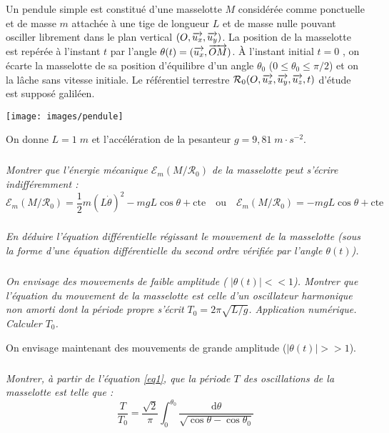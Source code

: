 \documentclass[10pt,oneside]{article}
\begin{document}
\begin{minipage}[c]{.6\linewidth}
Un pendule simple est constitué d'une masselotte $M$ considérée comme ponctuelle et de masse $m$ attachée à une tige de longueur $L$ et de masse nulle pouvant osciller librement dans le plan vertical $(O ,\overrightarrow{u_x} ,\overrightarrow{u_y} )$. La position de la masselotte
est repérée à l'instant $t$ par l'angle $\theta(t) = (\overrightarrow{u_x} , \overrightarrow{OM})$. À l'instant initial $t = 0$ , on écarte la masselotte de sa position d'équilibre d'un angle  $\theta_0$  ($0\leq \theta_0\leq\pi/2$) et on la lâche sans vitesse initiale. Le
référentiel terrestre $\mathcal{R}_0(O,\overrightarrow{u_x},\overrightarrow{u_y},\overrightarrow{u_z},t)$ d'étude est supposé galiléen.
\end{minipage}\hfill
\begin{minipage}[c]{.35\linewidth}
\begin{center}
\texttt{[image: images/pendule]}
\end{center}
\end{minipage}

On donne $L=1\;m$ et l'accélération de la pesanteur $g=9,81\; m\cdot s^{-2}$. 


\subparagraph{\label{q1}}
\textit{Montrer que l'énergie mécanique $\mathcal{E}_m(M/\mathcal{R}_0)$ de la masselotte peut s'écrire indifféremment :}
\begin{equation}
\label{eq1}
\mathcal{E}_m(M/\mathcal{R}_0) = \dfrac{1}{2}m\left( L\dot{\theta} \right)^2 -mgL\cos\theta + \text{cte} \quad \text{ou}\quad \mathcal{E}_m(M/\mathcal{R}_0) = -mgL\cos\theta + \text{cte}
\end{equation}

\subparagraph{}
\textit{En déduire l'équation différentielle régissant le mouvement de la masselotte (sous la forme d'une équation différentielle du second ordre vérifiée par l'angle $\theta(t)$).}

\subparagraph{}
\textit{On envisage des mouvements de faible amplitude ( $|\theta (t)| << 1$). Montrer que l'équation du mouvement de la masselotte est celle d'un oscillateur harmonique non amorti dont la période propre s'écrit $T_0=2\pi\sqrt{L/g}$. Application numérique. Calculer $T_0$.}


On envisage maintenant des mouvements de grande amplitude ($|\theta(t)| >> 1$).
\subparagraph{}
\textit{Montrer, à partir de l'équation \eqref{eq1}, que la période $T$ des oscillations de la masselotte est telle que :}
$$
\dfrac{T}{T_0} = \dfrac{\sqrt{2}}{\pi} \int^{\theta_0}_0 \dfrac{\mathrm{d}\theta}{\sqrt{\cos \theta - \cos\theta_0}}
$$
\end{document}
